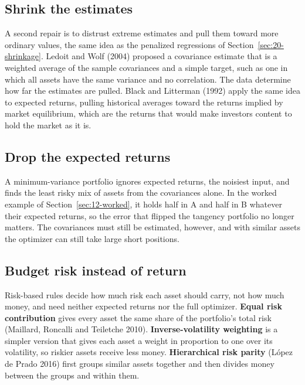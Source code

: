 \subsection{Shrink the estimates}

A second repair is to distrust extreme estimates and pull them toward more ordinary values, the same idea as the penalized regressions of Section~\ref{sec:20-shrinkage}. Ledoit and Wolf (2004) proposed a covariance estimate that is a weighted average of the sample covariances and a simple target, such as one in which all assets have the same variance and no correlation. The data determine how far the estimates are pulled. Black and Litterman (1992) apply the same idea to expected returns, pulling historical averages toward the returns implied by market equilibrium, which are the returns that would make investors content to hold the market as it is.

\subsection{Drop the expected returns}

A minimum-variance portfolio ignores expected returns, the noisiest input, and finds the least risky mix of assets from the covariances alone. In the worked example of Section~\ref{sec:12-worked}, it holds half in A and half in B whatever their expected returns, so the error that flipped the tangency portfolio no longer matters. The covariances must still be estimated, however, and with similar assets the optimizer can still take large short positions.

\subsection{Budget risk instead of return}

Risk-based rules decide how much risk each asset should carry, not how much money, and need neither expected returns nor the full optimizer. \textbf{Equal risk contribution} gives every asset the same share of the portfolio's total risk (Maillard, Roncalli and Teiletche 2010). \textbf{Inverse-volatility weighting} is a simpler version that gives each asset a weight in proportion to one over its volatility, so riskier assets receive less money. \textbf{Hierarchical risk parity} (L\'opez de Prado 2016) first groups similar assets together and then divides money between the groups and within them.

